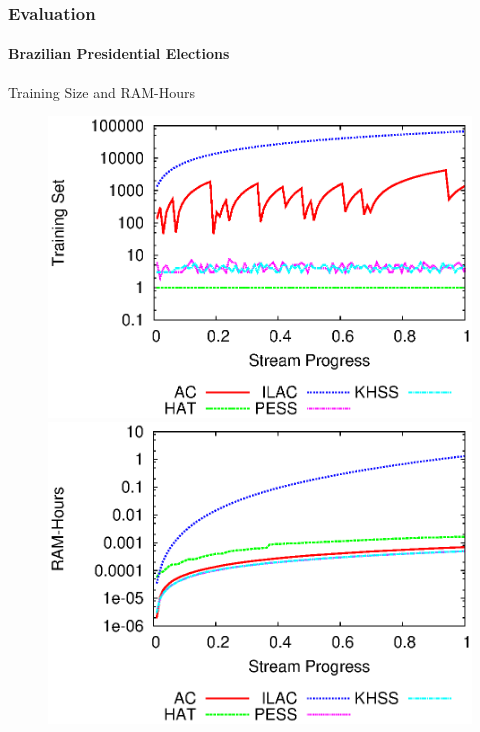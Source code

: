 \documentclass[14pt]{beamer}
\begin{document}
\begin{frame}
\frametitle{Evaluation}
\framesubtitle{Brazilian Presidential Elections}
Training Size and RAM-Hours
\begin{figure}[htp!]
\label{fig:dilma_2}
\centering
\includegraphics[scale=0.41]{dilma_window.eps}
\includegraphics[scale=0.41]{dilma_ramhours.eps}
\end{figure}
\end{frame}
\end{document}

